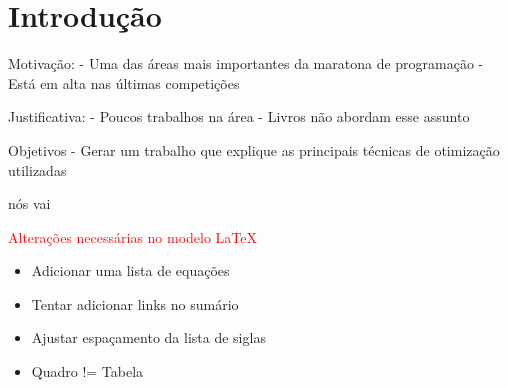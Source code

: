 \chapter{Introdu\c{c}\~ao}
\label{chap:introducao}

Motivação:
- Uma das áreas mais importantes da maratona de programação
- Está em alta nas últimas competições


Justificativa:
- Poucos trabalhos  na área
- Livros não abordam esse assunto


Objetivos
- Gerar um trabalho que explique as principais técnicas de otimização utilizadas

nós vai 

\textcolor{red}{Alterações necessárias no modelo \LaTeX}

\begin{itemize}
	\item Adicionar uma lista de equações
	\item Tentar adicionar links no sumário
	\item Ajustar espaçamento da lista de siglas
	\item Quadro != Tabela
\end{itemize}